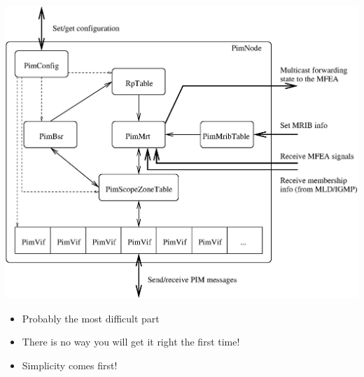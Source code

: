 \documentclass[landscape]{icsislides}
\begin{document}
\begin{slide}

\begin{center}
  \includegraphics[width=6.0in]{figs/pim_design_overview}
\end{center}

\end{slide}

\begin{slide}

\begin{itemize}

  \item Probably the most difficult part

  \item There is no way you will get it right the first time!

  \item Simplicity comes first!

\end{itemize}

\end{slide}
\end{document}
